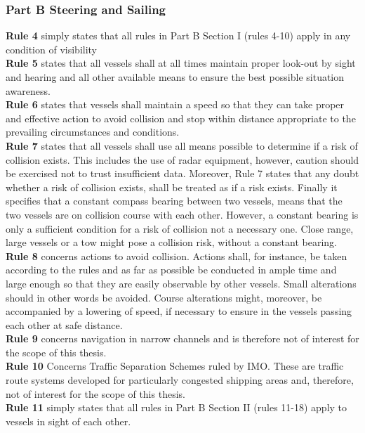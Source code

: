 \subsubsection{Part B Steering and Sailing}
\textbf{Rule 4} simply states that all rules in Part B Section I (rules 4-10) apply in any condition of visibility
\\
\textbf{Rule 5} states that all vessels shall at all times maintain proper look-out by sight and hearing and all other available means to ensure the best possible situation awareness.
\\
\textbf{Rule 6} states that vessels shall maintain a speed so that they can take proper and effective action to avoid collision and stop within distance appropriate to the prevailing circumstances and conditions.
\\
\textbf{Rule 7} states that all vessels shall use all means possible to determine if a risk of collision exists.
This includes the use of radar equipment, however, caution should be exercised not to trust insufficient data.
Moreover, Rule 7 states that any doubt whether a risk of collision exists, shall be treated as if a risk exists.
Finally it specifies that a constant compass bearing between two vessels, means that the two vessels are on collision course with each other.
However, a constant bearing is only a sufficient condition for a risk of collision not a necessary one.
Close range, large vessels or a tow might pose a collision risk, without a constant bearing.
\\
\textbf{Rule 8} concerns actions to avoid collision. Actions shall, for instance, be taken according to the rules and as far as possible be conducted in ample time and large enough so that they are easily observable by other vessels. Small alterations should in other words be avoided. Course alterations might, moreover, be accompanied by a lowering of speed, if necessary to ensure in the vessels passing each other at safe distance.
\\
\textbf{Rule 9} concerns navigation in narrow channels and is therefore not of interest for the scope of this thesis.
\\
\textbf{Rule 10} Concerns Traffic Separation Schemes ruled by IMO. These are traffic route systems developed for particularly congested shipping areas \cite{ships_routing_imo} and, therefore, not of interest for the scope of this thesis.
\\
\textbf{Rule 11} simply states that all rules in Part B Section II (rules 11-18) apply to vessels in sight of each other.
